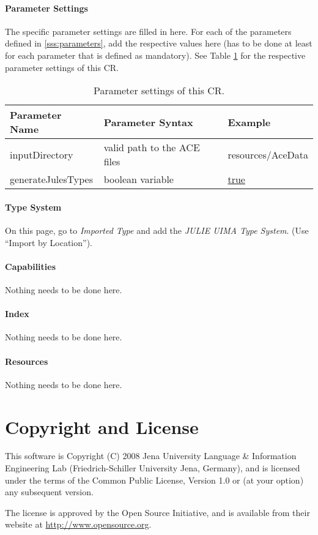 \documentclass[11pt,a4paper,halfparskip]{scrartcl}
\begin{document}
\paragraph{Parameter Settings}
\label{sss:param_settings}

The specific parameter settings are filled in here. For each of the
parameters defined in \ref{sss:parameters}, add the respective values
here (has to be done at least for each parameter that is defined as
mandatory). See Table \ref{tab:param_settings} for the respective
parameter settings of this CR.

\begin{table}[h!]
  \centering
  \begin{tabular}{|p{3cm}|p{5cm}|p{7cm}|}
    \hline
    Parameter Name & Parameter Syntax & Example \\
    \hline\hline
    	inputDirectory & valid path to the ACE files & resources/AceData\\
	generateJulesTypes & boolean variable & \url{true}\\
  \hline
  \end{tabular}
  \caption{Parameter settings of this CR.}
  \label{tab:param_settings}
\end{table}

\paragraph{Type System}
\label{sss:type_system}
On this page, go to \emph{Imported Type} and add the \emph{JULIE UIMA Type System}. (Use ``Import by Location'').


\paragraph{Capabilities}
Nothing needs to be done here.


\paragraph{Index}
Nothing needs to be done here.

\paragraph{Resources}
Nothing needs to be done here.


\section{Copyright and License}
This software is Copyright (C) 2008 Jena University Language \& Information
Engineering Lab (Friedrich-Schiller University Jena, Germany), and is
licensed under the terms of the Common Public License, Version 1.0 or (at
your option) any subsequent version.

The license is approved by the Open Source Initiative, and is
available from their website at \url{http://www.opensource.org}.



\end{document}
